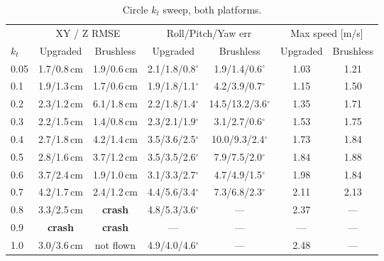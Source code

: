 \documentclass[11pt,a4paper]{article}
\begin{document}
\begin{table}[h]
\centering
\scriptsize
\renewcommand{\arraystretch}{1.1}
\begin{tabular}{@{}lcccccc@{}}
\toprule
& \multicolumn{2}{c}{XY / Z RMSE} & \multicolumn{2}{c}{Roll/Pitch/Yaw err} & \multicolumn{2}{c}{Max speed [m/s]} \\
\cmidrule(lr){2-3} \cmidrule(lr){4-5} \cmidrule(lr){6-7}
$k_t$ & Upgraded & Brushless & Upgraded & Brushless & Upgraded & Brushless \\
\midrule
0.05 & 1.7/0.8\,cm & 1.9/0.6\,cm & 2.1/1.8/0.8$^\circ$ & 1.9/1.4/0.6$^\circ$ & 1.03 & 1.21 \\
0.1  & 1.9/1.3\,cm & 1.7/0.6\,cm & 1.9/1.8/1.1$^\circ$ & 4.2/3.9/0.7$^\circ$ & 1.15 & 1.50 \\
0.2  & 2.3/1.2\,cm & 6.1/1.8\,cm & 2.2/1.8/1.4$^\circ$ & 14.5/13.2/3.6$^\circ$ & 1.35 & 1.71 \\
0.3  & 2.2/1.5\,cm & 1.4/0.8\,cm & 2.3/2.1/1.9$^\circ$ & 3.1/2.7/0.6$^\circ$ & 1.53 & 1.75 \\
0.4  & 2.7/1.8\,cm & 4.2/1.4\,cm & 3.5/3.6/2.5$^\circ$ & 10.0/9.3/2.4$^\circ$ & 1.73 & 1.84 \\
0.5  & 2.8/1.6\,cm & 3.7/1.2\,cm & 3.5/3.5/2.6$^\circ$ & 7.9/7.5/2.0$^\circ$ & 1.84 & 1.88 \\
0.6  & 3.7/2.4\,cm & 1.9/1.0\,cm & 3.1/3.3/2.7$^\circ$ & 4.7/4.9/1.5$^\circ$ & 1.98 & 1.84 \\
0.7  & 4.2/1.7\,cm & 2.4/1.2\,cm & 4.4/5.6/3.4$^\circ$ & 7.3/6.8/2.3$^\circ$ & 2.11 & 2.13 \\
0.8  & 3.3/2.5\,cm & \textbf{crash} & 4.8/5.3/3.6$^\circ$ & --- & 2.37 & --- \\
0.9  & \textbf{crash} & \textbf{crash} & --- & --- & --- & --- \\
1.0  & 3.0/3.6\,cm & not flown & 4.9/4.0/4.6$^\circ$ & --- & 2.48 & --- \\
\bottomrule
\end{tabular}
\caption{Circle $k_t$ sweep, both platforms.}
\label{tab:circle-ktsweep}
\end{table}
\end{document}

